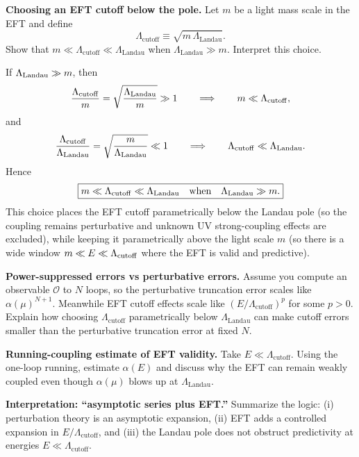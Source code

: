 \begin{problem}
    \textbf{Choosing an EFT cutoff below the pole.} Let \(m\) be a light mass scale in the EFT and define
    \[
        \Lambda_{\text{cutoff}}\equiv \sqrt{m\,\Lambda_{\text{Landau}}}.
    \]
    Show that \(m\ll \Lambda_{\text{cutoff}}\ll \Lambda_{\text{Landau}}\) when \(\Lambda_{\text{Landau}}\gg m\). Interpret this choice.
\end{problem}
\begin{solution}[32.4]
	If \(\Lambda_{\rm Landau}\gg m\), then
	\[
	\frac{\Lambda_{\rm cutoff}}{m}=\sqrt{\frac{\Lambda_{\rm Landau}}{m}}\gg 1
	\qquad\Longrightarrow\qquad
	m\ll \Lambda_{\rm cutoff},
	\]
	and
	\[
	\frac{\Lambda_{\rm cutoff}}{\Lambda_{\rm Landau}}=\sqrt{\frac{m}{\Lambda_{\rm Landau}}}\ll 1
	\qquad\Longrightarrow\qquad
	\Lambda_{\rm cutoff}\ll \Lambda_{\rm Landau}.
	\]
	Hence
	\[
	\boxed{m\ll \Lambda_{\rm cutoff}\ll \Lambda_{\rm Landau}\quad\text{when}\quad \Lambda_{\rm Landau}\gg m.}
	\]
	This choice places the EFT cutoff parametrically below the Landau pole (so the coupling remains perturbative and unknown UV strong-coupling effects are excluded), while keeping it parametrically above the light scale \(m\) (so there is a wide window \(m\ll E\ll \Lambda_{\rm cutoff}\) where the EFT is valid and predictive).
\end{solution}
\begin{problem}
    \textbf{Power-suppressed errors vs perturbative errors.} Assume you compute an observable \(\mathcal{O}\) to \(N\) loops, so the perturbative truncation error scales like \(\alpha(\mu)^{N+1}\). Meanwhile EFT cutoff effects scale like \((E/\Lambda_{\text{cutoff}})^p\) for some \(p>0\). Explain how choosing \(\Lambda_{\text{cutoff}}\) parametrically below \(\Lambda_{\text{Landau}}\) can make cutoff errors smaller than the perturbative truncation error at fixed \(N\).
\end{problem}
\begin{problem}
    \textbf{Running-coupling estimate of EFT validity.} Take \(E\ll \Lambda_{\text{cutoff}}\). Using the one-loop running, estimate \(\alpha(E)\) and discuss why the EFT can remain weakly coupled even though \(\alpha(\mu)\) blows up at \(\Lambda_{\text{Landau}}\).
\end{problem}
\begin{problem}
    \textbf{Interpretation: “asymptotic series plus EFT.”} Summarize the logic: (i) perturbation theory is an asymptotic expansion, (ii) EFT adds a controlled expansion in \(E/\Lambda_{\text{cutoff}}\), and (iii) the Landau pole does not obstruct predictivity at energies \(E\ll \Lambda_{\text{cutoff}}\).
\end{problem}
